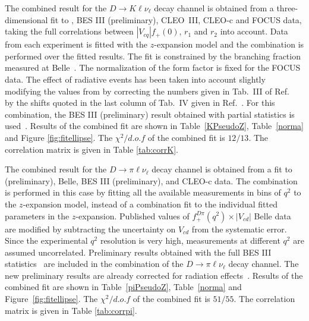 The combined result for the $D\to K \ell\nu_{\ell}$ decay channel is obtained from a three-dimensional fit to \babar, BES III (preliminary), CLEO~III, CLEO-c and FOCUS data, taking the full correlations between $|V_{cq}|f_+(0)$, $r_1$ and $r_2$ into account. 
Data from each experiment is fitted with the $z$-expansion model and the combination is performed over the fitted results. The fit is constrained by the branching fraction measured at Belle~\cite{Widhalm:2006wz}. The normalization of the form factor is fixed for the FOCUS data.  
The effect of radiative events has been taken into account slightly modifying the values from \babar by 
correcting the numbers given in Tab.~III of Ref.~\cite{Aubert:2007wg} by the shifts quoted in the last 
column of Tab.~IV given in Ref.~\cite{Aubert:2007wg}. For this combination, the BES III (preliminary) 
result obtained with partial statistics is used~\cite{BESIII}.
Results of the combined fit are shown in Table~\ref{KPseudoZ}, Table~\ref{norma} and Figure \ref{fig:fitellipse}. The $\chi^2/d.o.f$ of the combined fit is $12/13$. The correlation matrix is given in Table \ref{tab:corrK}.

The combined result for the $D\to \pi \ell\nu_{\ell}$ decay channel is obtained from a fit 
to \babar (preliminary), Belle, BES III (preliminary), and CLEO-c data. The combination is performed in this case by fitting all the available measurements in bins of $q^2$ to the $z$-expansion model, instead of a combination fit to the individual fitted parameters in the $z$-expansion. 
Published values of $f^{D\pi}_{+} (q^2) \times |V_{cd}|$ Belle data~\cite{Widhalm:2006wz} are modified 
by subtracting the uncertainty on $V_{cd}$ from the systematic error. Since the experimental $q^2$ resolution is very high, measurements at different $q^2$ are assumed uncorrelated. 
Preliminary results obtained with the full BES III statistics~\cite{BESIII-new} are included 
in the combination of the $D\to \pi \ell\nu_{\ell}$ decay channel.
The new preliminary \babar results are already corrected for radiation effects~\cite{Lees:2014jka}.
Results of the combined fit are shown in Table~\ref{piPseudoZ}, Table~\ref{norma} and 
Figure~\ref{fig:fitellipse}. The $\chi^2/d.o.f$ of the combined fit is $51/55$. 
The correlation matrix is given in Table \ref{tab:corrpi}.

